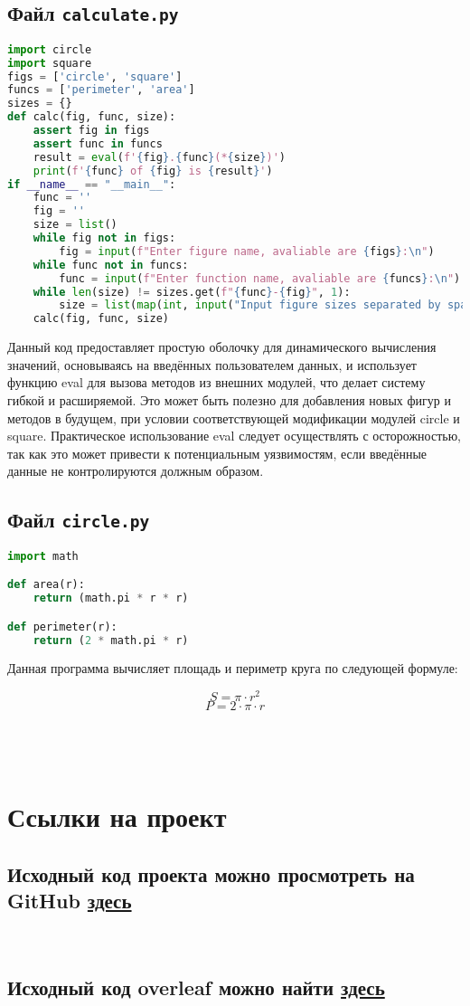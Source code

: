 \documentclass[a4paper,12pt]{article}
\begin{document}
\subsection{Файл \texttt{calculate.py}}
\begin{lstlisting}[language=Python]
import circle
import square
figs = ['circle', 'square']
funcs = ['perimeter', 'area']
sizes = {}
def calc(fig, func, size):
	assert fig in figs
	assert func in funcs
	result = eval(f'{fig}.{func}(*{size})')
	print(f'{func} of {fig} is {result}')
if __name__ == "__main__":
	func = ''
	fig = ''
	size = list()
	while fig not in figs:
		fig = input(f"Enter figure name, avaliable are {figs}:\n")
	while func not in funcs:
		func = input(f"Enter function name, avaliable are {funcs}:\n")
	while len(size) != sizes.get(f"{func}-{fig}", 1):
		size = list(map(int, input("Input figure sizes separated by space, 1 for circle and square\n").split(' ')))
	calc(fig, func, size)
\end{lstlisting}
Данный код предоставляет простую оболочку для динамического вычисления значений, основываясь на введённых пользователем данных, и использует функцию eval для вызова методов из внешних модулей, что делает систему гибкой и расширяемой. Это может быть полезно для добавления новых фигур и методов в будущем, при условии соответствующей модификации модулей circle и square. Практическое использование eval следует осуществлять с осторожностью, так как это может привести к потенциальным уязвимостям, если введённые данные не контролируются должным образом.
\newpage
\subsection{Файл \texttt{circle.py}}
\begin{lstlisting}[language=Python]
import math

def area(r):
    return (math.pi * r * r)

def perimeter(r):
    return (2 * math.pi * r)
\end{lstlisting}

Данная программа вычисляет площадь и периметр круга по следующей формуле:

\[
S = \pi \cdot r^2
\]
\[
P = 2 \cdot \pi \cdot r
\]
\\
\\
\\
\section{Ссылки на проект}
\subsection{Исходный код проекта можно просмотреть на GitHub \href{https://github.com/REDlordotw/geometric_lib/tree/feature}{здесь}}
\\
\subsection{Исходный код overleaf можно найти
\href{https://github.com/REDlordotw/Latex_ITMO}{здесь}}
\end{document}
